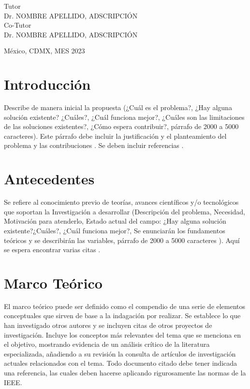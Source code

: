\documentclass[letterpaper,12pt,oneside]{article}
\begin{document}
\begin{titlepage}
\begin{center}
\begin{center}
				\bigskip
				
				Tutor\\
				Dr. NOMBRE APELLIDO, ADSCRIPCIÓN\\
				
				Co-Tutor \\ %
                Dr. NOMBRE APELLIDO, ADSCRIPCIÓN\\
			\end{center}
			
			\vfill
			
			\begin{center}
				{México, CDMX, MES 2023}\\
			\end{center}
			\cleardoublepage
		\end{center}
	\end{titlepage}
 
\clearpage

\tableofcontents
\clearpage

\section{Introducción} 
Describe de manera inicial la propuesta (¿Cuál es el problema?, ¿Hay alguna solución existente? ¿Cuáles?, ¿Cuál funciona mejor?, ¿Cuáles son las limitaciones de las soluciones existentes?, ¿Cómo espera contribuir?, párrafo de 2000 a 5000 caracteres). Este párrafo debe incluir la justificación y el planteamiento del problema y las contribuciones \cite{phil99}. Se deben incluir referencias \cite{smit54, jame76}.

\section{Antecedentes}
Se refiere al conocimiento previo de teorías, avances científicos y/o tecnológicos que soportan la Investigación a desarrollar (Descripción del problema, Necesidad, Motivación para atenderlo, Estado actual del campo: ¿Hay alguna solución existente?¿Cuáles?, ¿Cuál funciona mejor?, Se enunciarán los fundamentos teóricos y se describirán las variables, párrafo de 2000 a 5000 caracteres \cite{gree00}). Aquí se espera encontrar varias citas \cite{colu92}. 

\section{Marco Teórico}
El marco teórico puede ser definido como el compendio de una serie de elementos conceptuales que sirven de base a la indagación por realizar. Se establece lo que han investigado otros autores y se incluyen citas de otros proyectos de investigación.
Incluye los conceptos más relevantes del tema que se menciona en el objetivo, mostrando evidencia de un análisis crítico de la literatura especializada, añadiendo a su revisión la consulta de artículos de investigación actuales relacionados con el tema. 
Todo documento citado debe tener indicada una referencia, las cuales deben hacerse aplicando rigurosamente las normas de la IEEE.
\end{document}
